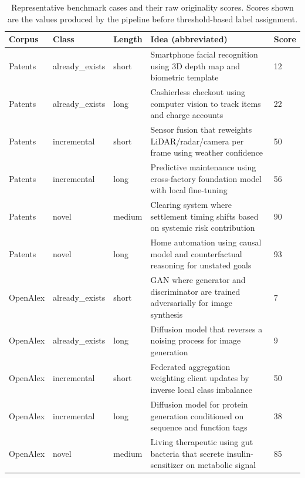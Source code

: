 \begin{table}[width=\textwidth,cols=5,pos=ht]
    \caption{Representative benchmark cases and their raw originality scores. Scores shown are the values produced by the pipeline before threshold-based label assignment.}
    \label{tab:examples}
    \begin{tabular*}{\textwidth}{@{\extracolsep{\fill}}lllp{6cm}l@{}}
        \toprule
        Corpus   & Class          & Length & Idea (abbreviated)                                                                 & Score \\
        \midrule
        Patents  & already\_exists & short  & Smartphone facial recognition using 3D depth map and biometric template            & 12    \\
        Patents  & already\_exists & long   & Cashierless checkout using computer vision to track items and charge accounts       & 22    \\
        Patents  & incremental     & short  & Sensor fusion that reweights LiDAR/radar/camera per frame using weather confidence  & 50    \\
        Patents  & incremental     & long   & Predictive maintenance using cross-factory foundation model with local fine-tuning  & 56    \\
        Patents  & novel           & medium & Clearing system where settlement timing shifts based on systemic risk contribution  & 90    \\
        Patents  & novel           & long   & Home automation using causal model and counterfactual reasoning for unstated goals  & 93    \\
        \midrule
        OpenAlex & already\_exists & short  & GAN where generator and discriminator are trained adversarially for image synthesis & 7     \\
        OpenAlex & already\_exists & long   & Diffusion model that reverses a noising process for image generation                & 9     \\
        OpenAlex & incremental     & short  & Federated aggregation weighting client updates by inverse local class imbalance     & 50    \\
        OpenAlex & incremental     & long   & Diffusion model for protein generation conditioned on sequence and function tags     & 38    \\
        OpenAlex & novel           & medium & Living therapeutic using gut bacteria that secrete insulin-sensitizer on metabolic signal & 85 \\

\end{tabular*}
\end{table}
